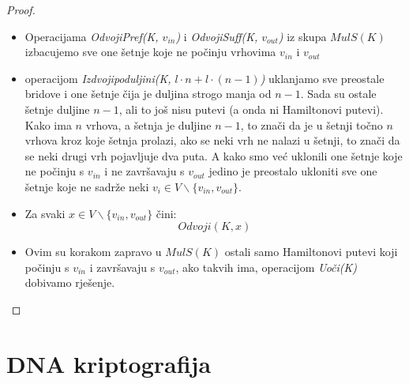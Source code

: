 \documentclass[a4paper,oneside,12pt]{memoir} %
\begin{document}
\begin{spacing}{1.5}
\begin{proof}
\begin{itemize}
        \item Operacijama \textit{Odvoji\textunderscore Pref(K, $v_{in}$)} i \textit{Odvoji\textunderscore Suff(K, $v_{out}$)} iz skupa $MulS(K)$ izbacujemo sve one šetnje koje ne počinju vrhovima $v_{in}$ i $v_{out}$
        \item operacijom \textit{Izdvoji\textunderscore po\textunderscore duljini(K, $l\cdot n + l\cdot (n-1)$)} uklanjamo sve preostale bridove i one šetnje čija je duljina strogo manja od $n-1$.
        Sada su ostale šetnje duljine $n-1$, ali to još nisu putevi (a onda ni Hamiltonovi putevi). Kako ima $n$ vrhova, a šetnja je duljine $n-1$, to znači da je u šetnji točno $n$ vrhova kroz koje šetnja prolazi, ako se neki vrh ne nalazi u šetnji, to znači da se neki drugi vrh pojavljuje dva puta. A kako smo već uklonili one šetnje koje ne počinju s  $v_{in}$ i ne završavaju s $v_{out}$ jedino je preostalo ukloniti sve one šetnje koje ne sadrže neki $v_i \in V \backslash \{v_{in}, v_{out}\}$.
        \item Za svaki $x \in V \backslash \{v_{in}, v_{out}\}$ čini:
        \[Odvoji(K,x)\]
        \item Ovim su korakom zapravo u $MulS(K)$ ostali samo Hamiltonovi putevi koji počinju s  $v_{in}$ i završavaju s $v_{out}$, ako takvih ima, operacijom \textit{Uoči(K)} dobivamo rješenje.
    \end{itemize} 
\end{proof}
\chapter{DNA kriptografija}

\end{spacing}
\end{document}
